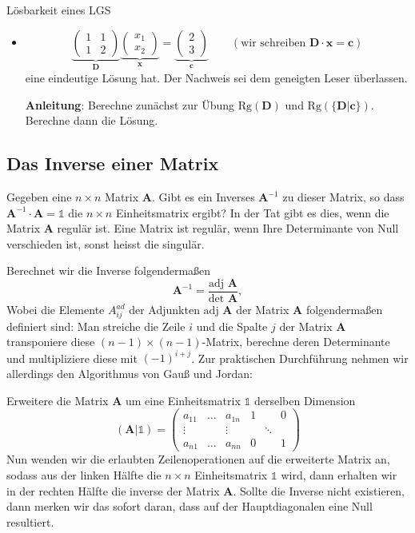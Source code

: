 \begin{example}{Lösbarkeit eines LGS}
\begin{itemize}
      Wohingegen das LGS
    \item
       \[
        \underbrace{\begin{pmatrix}1&1\\1&2\end{pmatrix}}_{\mathbf{D}}
        \underbrace{\begin{pmatrix}x_1\\x_2\end{pmatrix}}_{\mathbf{x}}=
        \underbrace{\begin{pmatrix}2\\3\end{pmatrix}}_{\mathbf{c}}
	\qquad(\text{wir schreiben }\mathbf{D\cdot x}=\mathbf{c})
      \]
      eine eindeutige Lösung hat. Der Nachweis sei dem geneigten Leser überlassen.

      \textbf{Anleitung}: Berechne zunächst zur Übung $\text{Rg}(\mathbf{D})$ und
      $\text{Rg}(\mathbf{\{D|c\}})$. Berechne dann die Lösung.


  \end{itemize}
\end{example}
\subsection{Das Inverse einer Matrix}
Gegeben eine $n\times n$ Matrix $\mathbf{A}$. Gibt es ein Inverses $\mathbf{A}^{-1}$ zu dieser Matrix, so dass $\mathbf{A}^{-1}\cdot\mathbf{A}=\mathds{1}$ die $n\times n$ Einheitsmatrix ergibt? In der Tat gibt es dies, wenn die Matrix $\mathbf{A}$ regulär ist. Eine Matrix ist regulär, wenn Ihre Determinante von Null verschieden ist, sonst heisst die singulär.

Berechnet wir die Inverse folgendermaßen
\begin{equation}\label{eq:matrixinverse}
    \mathbf{A}^{-1}=\frac{\text{adj }\mathbf{A}}{\text{det }\mathbf{A}},
\end{equation}
Wobei die Elemente $A^{ad}_{ij}$ der Adjunkten $\text{adj }\mathbf{A}$ der Matrix $\mathbf{A}$ folgendermaßen definiert sind: Man streiche die Zeile $i$ und die Spalte $j$ der Matrix $\mathbf{A}$ transponiere diese $(n-1)\times(n-1)$-Matrix, berechne deren Determinante und multipliziere diese mit $(-1)^{i+j}$. Zur praktischen Durchführung nehmen wir allerdings den Algorithmus von Gauß und Jordan:

Erweitere die Matrix $\mathbf{A}$ um eine Einheitsmatrix $\mathds{1}$ derselben Dimension
\begin{equation*}
    (\mathbf{A}|\mathds{1})=
    \begin{pmatrix}
    a_{11}&\dots&a_{1n}&1&&0\\
    \vdots&&\vdots&&\ddots&\\
    a_{n1}&\dots&a_{nn}&0&&1
    \end{pmatrix}
\end{equation*}
Nun wenden wir die erlaubten Zeilenoperationen auf die erweiterte Matrix an, sodass aus der linken Hälfte die $n\times n$ Einheitsmatrix $\mathds{1}$ wird, dann erhalten wir in der rechten Hälfte die inverse der Matrix $\mathbf{A}$. Sollte die Inverse nicht existieren, dann merken wir das sofort daran, dass auf der Hauptdiagonalen eine Null resultiert.
